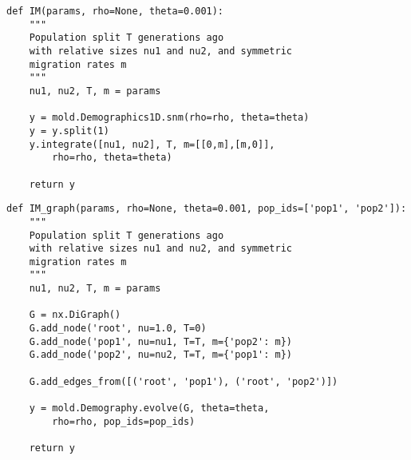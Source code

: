 \documentclass[10pt]{article}
\begin{document}
\begin{lstlisting}[caption={\textbf{IM model:} One population splits into two some time in the past. Each population can have a new size, with symmetric and continuous migration between populations.}, float, label={lst:IM}]
def IM(params, rho=None, theta=0.001):
    """
    Population split T generations ago
    with relative sizes nu1 and nu2, and symmetric
    migration rates m
    """
    nu1, nu2, T, m = params
    
    y = mold.Demographics1D.snm(rho=rho, theta=theta)
    y = y.split(1)
    y.integrate([nu1, nu2], T, m=[[0,m],[m,0]],
        rho=rho, theta=theta)
    
    return y
\end{lstlisting}

\begin{lstlisting}[caption={\textbf{IM model using Demography:} The same isolation with migration model, defined using the graphical representation of the Demography method.}, float, label={lst:IM_demo}]
def IM_graph(params, rho=None, theta=0.001, pop_ids=['pop1', 'pop2']):
    """
    Population split T generations ago
    with relative sizes nu1 and nu2, and symmetric
    migration rates m
    """
    nu1, nu2, T, m = params
    
    G = nx.DiGraph()
    G.add_node('root', nu=1.0, T=0)
    G.add_node('pop1', nu=nu1, T=T, m={'pop2': m})
    G.add_node('pop2', nu=nu2, T=T, m={'pop1': m})

    G.add_edges_from([('root', 'pop1'), ('root', 'pop2')])
    
    y = mold.Demography.evolve(G, theta=theta, 
        rho=rho, pop_ids=pop_ids)
    
    return y
\end{lstlisting}
\end{document}
